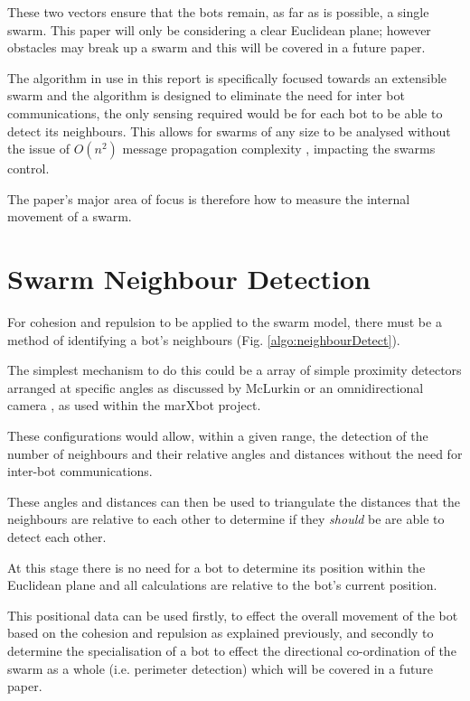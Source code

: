 \documentclass[10pt,journal,letterpaper,twoside]{IEEEtran}
\newcommand{\stability}{internal movement}
\begin{document}
These two vectors ensure that the bots remain, as far as is possible, a single swarm. This paper will only be considering a clear Euclidean plane; however obstacles may break up a swarm and this will be covered in a future paper.

The algorithm in use in this report is specifically focused towards an extensible swarm and the algorithm is designed to eliminate the need for inter bot communications, the only sensing required would be for each bot to be able to detect its neighbours. This allows for swarms of any size to be analysed without the issue of $O(n^2)$ message propagation complexity \cite{PADZMAKC09}, \cite{MJ08} impacting the swarms control.

The paper's major area of focus is therefore how to measure the \stability{} of a swarm.

\section{Swarm Neighbour Detection\label{section:swarmNeighbourDetection}}

For cohesion and repulsion to be applied to the swarm model, there must be a method of identifying a bot's neighbours (Fig. \ref{algo:neighbourDetect}).

The simplest mechanism to do this could be a array of simple proximity detectors arranged at specific angles as discussed by McLurkin \cite{MJ08} or an omnidirectional camera \cite{HSAUAPPRFM11}, \cite{MD07} as used within the marXbot project.

These configurations would allow, within a given range, the detection of the number of neighbours and their relative angles and distances without the need for inter-bot communications.

These angles and distances can then be used to triangulate the distances that the neighbours are relative to each other to determine if they \textit{should} be are able to detect each other.

At this stage there is no need for a bot to determine its position within the Euclidean plane and all calculations are relative to the bot's current position.

This positional data can be used firstly, to effect the overall movement of the bot based on the cohesion and repulsion as explained previously, and secondly to determine the specialisation of a bot to effect the directional co-ordination of the swarm as a whole (i.e. perimeter detection) which will be covered in a future paper.
\end{document}
